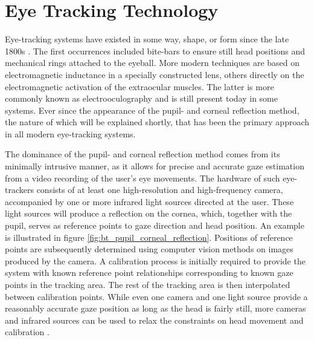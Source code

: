 \section{Eye Tracking Technology} \label{sec:bt/ET_tech}

Eye-tracking systems have existed in some way, shape, or form since the late 1800s \cite{holmqvist2011}. The first occurrences included bite-bars to ensure still head positions and mechanical rings attached to the eyeball. More modern techniques are based on electromagnetic inductance in a specially constructed lens, others directly on the electromagnetic activation of the extraocular muscles. The latter is more commonly known as electrooculography and is still present today in some systems. Ever since the appearance of the pupil- and corneal reflection method, the nature of which will be explained shortly, that has been the primary approach in all modern eye-tracking systems. 

The dominance of the pupil- and corneal reflection method comes from its minimally intrusive manner, as it allows for precise and accurate gaze estimation from a video recording of the user's eye movements. The hardware of such eye-trackers consists of at least one high-resolution and high-frequency camera, accompanied by one or more infrared light sources directed at the user. These light sources will produce a reflection on the cornea, which, together with the pupil, serves as reference points to gaze direction and head position. An example is illustrated in figure \ref{fig:bt_pupil_corneal_reflection}. Positions of reference points are subsequently determined using computer vision methods on images produced by the camera. A calibration process is initially required to provide the system with known reference point relationships corresponding to known gaze points in the tracking area. The rest of the tracking area is then interpolated between calibration points. While even one camera and one light source provide a reasonably accurate gaze position as long as the head is fairly still, more cameras and infrared sources can be used to relax the constraints on head movement and calibration \cite{holmqvist2011}. 

